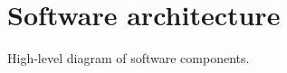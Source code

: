 
\section{Software architecture}\label{sec:software-architecture}
{\color{gray} High-level diagram of software components.}